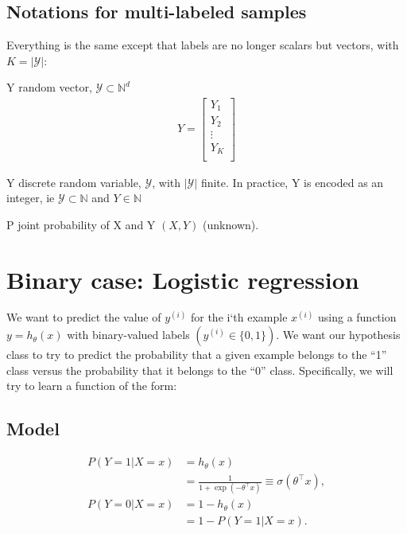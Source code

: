 \subsection*{Notations for multi-labeled samples}

Everything is the same except that labels are no longer scalars but vectors, with $K = |\mathcal{Y}|$:

\begin{outline}
\1 Y random vector, $\mathcal{Y} \subset \mathbb{N}^d$
\begin{align}
	Y = \left[
	\begin{array}{cccc}
		Y_{1} \\
		Y_{2} \\
		\vdots\\
		Y_{K} \\
	\end{array}\right]
\end{align}

\1 Y discrete random variable, $\mathcal{Y} $, with $|\mathcal{Y}|$ finite. In practice, Y is encoded as an integer, ie $\mathcal{Y} \subset \mathbb{N} $ and $Y \in \mathbb{N}$

\1 P joint probability of X and Y $(X,Y)$ (unknown).
\end{outline}






\section{Binary case: Logistic regression} %
\label{sec:workflow}


We want to predict the value of $y^{(i)}$ for the i‘th example $x^{(i)}$ using a function $y = h_\theta(x) $ with binary-valued labels $\left(y^{(i)} \in \{0,1\}\right)$. We want our hypothesis class to try to predict the probability that a given example belongs to the “1” class versus the probability that it belongs to the “0” class. Specifically, we will try to learn a function of the form:

\subsection{Model}
\begin{align}
	P(Y=1|X=x) &= h_\theta(x) \\
			 &= \frac{1}{1 + \exp(-\theta^\top x)} \equiv \sigma(\theta^\top x),\\
	P(Y=0|X=x) &= 1 - h_\theta(x) \\
			 &= 1 - P(Y=1|X=x).
\end{align}

